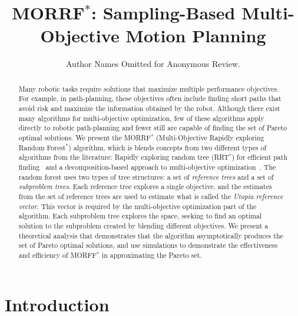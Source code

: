 \documentclass{article}
\title{ MORRF$^*$: Sampling-Based Multi-Objective Motion Planning }
\author{Author Names Omitted for Anonymous Review.}
\begin{document}
\maketitle

\begin{abstract}
Many robotic tasks require solutions that maximize multiple performance objectives.  
For example, in path-planning, these objectives often include finding short paths that avoid risk and maximize the information obtained by the robot.  
Although there exist many algorithms for multi-objective optimization, few of these algorithms apply directly to robotic path-planning and fewer still are capable of finding the set of Pareto optimal solutions.  
We present the MORRF$^{*}$ (Multi-Objective Rapidly exploring Random Forest$^{*}$) algorithm, which is blends concepts from two different types of algorithms from the literature: Rapidly exploring random tree (RRT$^{*}$) for efficient path finding~\cite{Karaman.Frazzoli:RSS10} and a decomposition-based approach to multi-objective optimization~\cite{4358754}.  
The random forest uses two types of tree structures: a set of {\em reference trees} and a set of {\em subproblem trees}.  
Each reference tree explores a single objective, and the estimates from the set of reference trees are used to estimate what is called the {\em Utopia reference vector}. This vector is required by the multi-objective optimization part of the algorithm.  
Each subproblem tree explores the space, seeking to find an optimal solution to the subproblem created by blending different objectives.  
We present a theoretical analysis that demonstrates that the algorithm asymptotically produces the set of Pareto optimal solutions, and use simulations to demonstrate the effectiveness and efficiency of MORFF$^{*}$ in approximating the Pareto set.
\end{abstract}

\section{Introduction}
\label{sec:intro}
\end{document}
